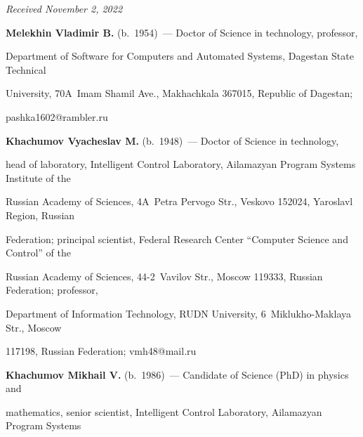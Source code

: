 \hfill{\small\textit{Received November 2, 2022}} 





\vspace*{-18pt}





\Contr





\noindent


\textbf{Melekhin Vladimir B.} (b.\ 1954)~--- Doctor of Science in technology, professor, 


Department of Software for Computers and Automated Systems, Dagestan State Technical 


University, 70A~Imam Shamil Ave., Makhachkala 367015, Republic of Dagestan; 


\mbox{pashka1602@rambler.ru}





\vspace*{3pt}





\noindent


\textbf{Khachumov Vyacheslav M.} (b.\ 1948)~--- Doctor of Science in technology, 


head of laboratory, Intelligent Control Laboratory, Ailamazyan Program Systems Institute of the


Russian Academy of Sciences, 4A~Petra Pervogo Str., Veskovo 152024, Yaroslavl Region, Russian 


Federation; principal scientist, Federal Research Center ``Computer Science and Control'' of the 


Russian Academy of Sciences, 44-2~Vavilov Str., Moscow 119333, Russian Federation; professor, 


Department of Information Technology, RUDN University, 6~Miklukho-Maklaya Str., Moscow 


117198, Russian Federation; \mbox{vmh48@mail.ru}


\vspace*{3pt}





\noindent


\textbf{Khachumov Mikhail V.} (b.\ 1986)~--- Candidate of Science (PhD) in physics and 


mathematics, senior scientist, Intelligent Control Laboratory, Ailamazyan Program Systems 


